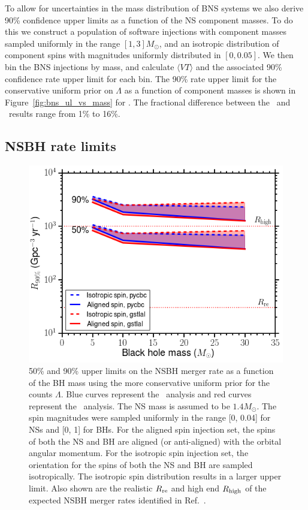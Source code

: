 To allow for uncertainties in the mass distribution of \ac{BNS} systems we also
derive 90\% confidence upper limits as a function of the \ac{NS} component masses.
To do this we construct a population of software injections with component masses
sampled uniformly in the range $[1, 3]M_{\odot}$, and an isotropic distribution
of component spins with magnitudes uniformly distributed in $[0, 0.05]$. We then bin
the \ac{BNS} injections by mass, and calculate $\langle VT \rangle$ and the associated 90\%
confidence rate upper limit for each bin. The 90\% rate upper limit for the conservative
uniform prior on $\Lambda$ as a function of component masses is shown in 
Figure~\ref{fig:bns_ul_vs_mass} for \pycbc. The fractional difference between the \pycbc\
and \gstlal\ results range from 1\% to 16\%.


\subsection{NSBH rate limits}
\label{ssec:nsbh_rate_limits}

\begin{figure}[t]
\centering
\includegraphics[width=1.0\textwidth]{figs/chapter3/figure5.png}
\caption{\label{fig:nsbh_ul_vs_mass} 50\% and 90\% upper limits on the \ac{NSBH} merger rate
as a function of the \ac{BH} mass using the more conservative uniform prior for the counts $\Lambda$. 
Blue curves represent the \pycbc\ analysis and red curves
represent the \gstlal\ analysis. The \ac{NS} mass is assumed to be $1.4M_\odot$. The spin magnitudes
were sampled uniformly in the range [0, 0.04] for \acp{NS} and [0, 1] for \acp{BH}. For the aligned
spin injection set, the spins of both the \ac{NS} and \ac{BH} are aligned (or anti-aligned) with the
orbital angular momentum. For the isotropic spin injection set, the orientation for the
spins of both the \ac{NS} and \ac{BH} are sampled isotropically. The isotropic spin distribution results
in a larger upper limit. Also shown are the realistic $R_{\rm re}$ and high end
$R_{\rm high}$ of the expected \ac{NSBH} merger rates identified in Ref.~\citep{Abadie:2010cf}.}
\end{figure}

